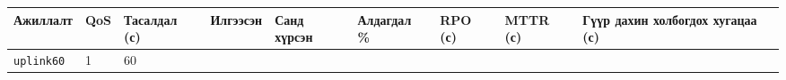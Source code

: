 \begingroup\scriptsize\begin{longtable}[]{@{}lllllllll@{}}
\toprule
\begin{minipage}[b]{0.08\columnwidth}\raggedright
Ажиллалт\strut
\end{minipage} & \begin{minipage}[b]{0.08\columnwidth}\raggedright
QoS\strut
\end{minipage} & \begin{minipage}[b]{0.08\columnwidth}\raggedright
Тасалдал (с)\strut
\end{minipage} & \begin{minipage}[b]{0.08\columnwidth}\raggedright
Илгээсэн\strut
\end{minipage} & \begin{minipage}[b]{0.08\columnwidth}\raggedright
Санд хүрсэн\strut
\end{minipage} & \begin{minipage}[b]{0.08\columnwidth}\raggedright
Алдагдал \%\strut
\end{minipage} & \begin{minipage}[b]{0.08\columnwidth}\raggedright
\textbf{RPO (с)}\strut
\end{minipage} & \begin{minipage}[b]{0.08\columnwidth}\raggedright
\textbf{MTTR (с)}\strut
\end{minipage} & \begin{minipage}[b]{0.08\columnwidth}\raggedright
Гүүр дахин холбогдох хугацаа (с)\strut
\end{minipage}\tabularnewline
\midrule
\endhead
\begin{minipage}[t]{0.08\columnwidth}\raggedright
\texttt{uplink60}\strut
\end{minipage} & \begin{minipage}[t]{0.08\columnwidth}\raggedright
1\strut
\end{minipage} & \begin{minipage}[t]{0.08\columnwidth}\raggedright
60\strut
\end{minipage} & \begin{minipage}[t]{0.08\columnwidth}\raggedright
\strut
\end{minipage} & \begin{minipage}[t]{0.08\columnwidth}\raggedright
\strut
\end{minipage} & \begin{minipage}[t]{0.08\columnwidth}\raggedright
\strut
\end{minipage} & \begin{minipage}[t]{0.08\columnwidth}\raggedright

\end{minipage}
\end{longtable}
